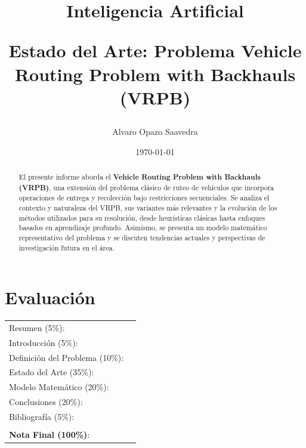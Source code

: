 \documentclass[letter, 10pt]{article}
\begin{document}
\title{Inteligencia Artificial \\ \begin{Large}Estado del Arte: Problema Vehicle Routing Problem with Backhauls (VRPB)\end{Large}}
\author{Alvaro Opazo Saavedra}
\date{\today}
\maketitle


\section*{Evaluaci\'on}

\begin{tabular}{ll}
Resumen (5\%): & \underline{\hspace{2cm}} \\
Introducci\'on (5\%):  & \underline{\hspace{2cm}} \\
Definici\'on del Problema (10\%):  & \underline{\hspace{2cm}} \\
Estado del Arte (35\%):  & \underline{\hspace{2cm}} \\
Modelo Matem\'atico (20\%): &  \underline{\hspace{2cm}}\\
Conclusiones (20\%): &  \underline{\hspace{2cm}}\\
Bibliograf\'ia (5\%): & \underline{\hspace{2cm}}\\
 &  \\
\textbf{Nota Final (100\%)}:   & \underline{\hspace{2cm}}
\end{tabular}
\vspace{2cm}


\begin{abstract}
El presente informe aborda el \textbf{Vehicle Routing Problem with Backhauls (VRPB)}, una extensi\'on del problema cl\'asico de ruteo de veh\'iculos que incorpora operaciones de entrega y recolecci\'on bajo restricciones secuenciales. Se analiza el contexto y naturaleza del VRPB, sus variantes m\'as relevantes y la evoluci\'on de los m\'etodos utilizados para su resoluci\'on, desde heur\'isticas cl\'asicas hasta enfoques basados en aprendizaje profundo. Asimismo, se presenta un modelo matem\'atico representativo del problema y se discuten tendencias actuales y perspectivas de investigaci\'on futura en el \'area.
\end{abstract}
\end{document}

